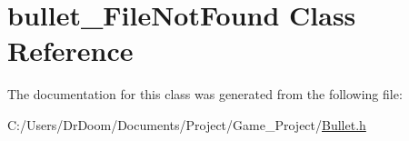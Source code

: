 \hypertarget{classbullet___file_not_found}{}\section{bullet\+\_\+\+File\+Not\+Found Class Reference}
\label{classbullet___file_not_found}


The documentation for this class was generated from the following file\+:\begin{DoxyCompactItemize}
\item 
C\+:/\+Users/\+Dr\+Doom/\+Documents/\+Project/\+Game\+\_\+\+Project/\hyperlink{_bullet_8h}{Bullet.\+h}\end{DoxyCompactItemize}

